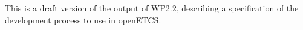 
This is a draft version of the output of WP2.2, describing a specification of
the development process to use in openETCS.

